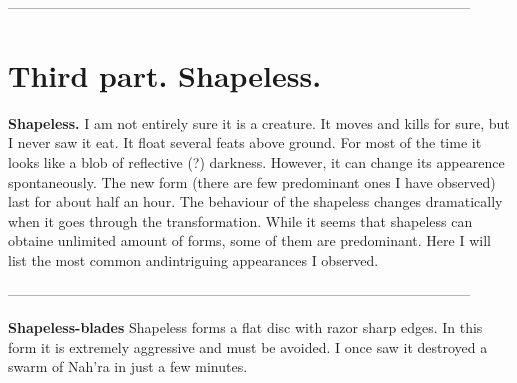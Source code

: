 \documentclass[14p]{book}
\begin{document}

{\color{l} ---------------------------------------------------------------------------------------------------\\}
\section{Third part. Shapeless.}

\textbf{Shapeless.} I am not entirely sure it is a creature. It moves and kills for sure, but I never saw it eat. It float several feats above ground. For most of the time it looks like a blob of reflective (?) darkness. However, it can change its appearence spontaneously. The new form (there are few predominant ones I have observed) last for about half an hour. The behaviour of the shapeless changes dramatically when it goes through the transformation. While it seems that shapeless can obtaine unlimited amount of forms, some of them are predominant. Here I will list the most common andintriguing appearances I observed.

{\color{l} ---------------------------------------------------------------------------------------------------\\}

\textbf{Shapeless-blades} Shapeless forms a flat disc with razor sharp edges. In this form it is extremely aggressive and must be avoided. I once saw it destroyed a swarm of Nah'ra in just a few minutes.
\end{document}

